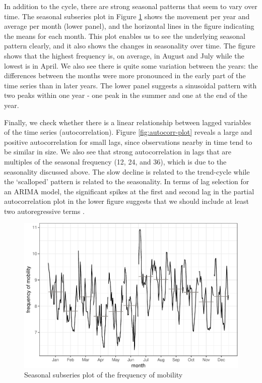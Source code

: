 \documentclass[12pt, a4paper]{article}
\begin{document}
In addition to the cycle, there are strong seasonal patterns that seem
to vary over time. The seasonal subseries plot in Figure
\ref{fig:freq-month-plot} shows the movement per year and average per
month (lower panel), and the horizontal lines in the figure indicating
the means for each month. This plot enables us to see the underlying
seasonal pattern clearly, and it also shows the changes in seasonality
over time. The figure shows that the highest frequency is, on average,
in August and July while the lowest is in April. We also see there is
quite some variation between the years: the differences between the
months were more pronounced in the early part of the time series than in
later years. The lower panel suggests a sinusoidal pattern with two
peaks within one year - one peak in the summer and one at the end of the
year.

Finally, we check whether there is a linear relationship between lagged
variables of the time series (autocorrelation). Figure
\ref{fig:autocorr-plot} reveals a large and positive autocorrelation for
small lags, since observations nearby in time tend to be similar in
size. We also see that strong autocorrelation in lags that are multiples
of the seasonal frequency (12, 24, and 36), which is due to the
seasonality discussed above. The slow decline is related to the
trend-cycle while the `scalloped' pattern is related to the seasonality.
In terms of lag selection for an ARIMA model, the significant spikes at
the first and second lag in the partial autocorrelation plot in the
lower figure suggests that we should include at least two autoregressive
terms \citep{hyndman2018forecasting}.

\begin{figure}[H]
  \caption{\label{fig:freq-month-plot}Seasonal subseries plot of the frequency
of mobility}
\centering
\includegraphics[scale = 0.8]{../figs/freq--freq-month-plot-1.pdf}
\end{figure}
\end{document}
